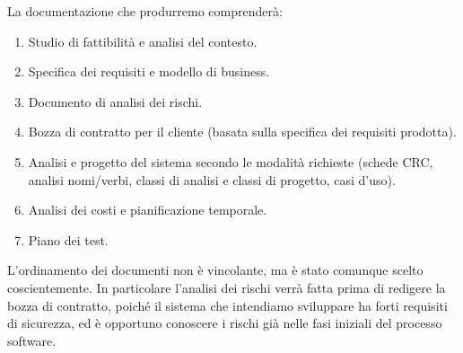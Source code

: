 \documentclass[]{softeng}
\begin{document}
La documentazione che produrremo comprender\`a:
\begin{enumerate}
	\item Studio di fattibilit\`a e analisi del contesto.
	\item Specifica dei requisiti e modello di business.
	\item Documento di analisi dei rischi.
	\item Bozza di contratto per il cliente (basata sulla specifica dei requisiti prodotta).
	\item Analisi e progetto del sistema secondo le modalit\`a richieste (schede CRC, analisi nomi/verbi, classi di analisi e classi di progetto, casi d'uso).
	\item Analisi dei costi e pianificazione temporale.
	\item Piano dei test.
\end{enumerate}
L'ordinamento dei documenti non \`e vincolante, ma \`e stato comunque scelto coscientemente.
In particolare l'analisi dei rischi verr\`a fatta prima di redigere la bozza di contratto, poich\'e il sistema che intendiamo sviluppare ha forti requisiti di sicurezza, ed \`e opportuno conoscere i rischi gi\`a nelle fasi iniziali del processo software.

\renewcommand{\refname}{Riferimenti}
\printbibliography
\end{document}

